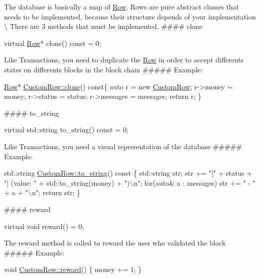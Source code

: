 The database is basically a map of \mbox{\hyperlink{classRow}{Row}}. Rows are pure abstract classes that needs to be implemented, because their structure depends of your implementation \textbackslash{} There are 3 methods that must be implemented. \#\#\#\# clone 
\begin{DoxyCode}
\textcolor{keyword}{virtual} \mbox{\hyperlink{classRow}{Row}}* clone() \textcolor{keyword}{const} = 0;
\end{DoxyCode}
 Like Transactions, you need to duplicate the \mbox{\hyperlink{classRow}{Row}} in order to accept differents states on differents blocks in the block chain \#\#\#\#\# Example\+: 
\begin{DoxyCode}
\mbox{\hyperlink{classRow}{Row}}* \mbox{\hyperlink{classCustomRow_a9d3c1b6bda5e63de382cc4a2aa29210d}{CustomRow::clone}}()\textcolor{keyword}{ const}\{
    \textcolor{keyword}{auto} r = \textcolor{keyword}{new} \mbox{\hyperlink{classCustomRow}{CustomRow}};
    r->money = money;
    r->status = status;
    r->messages = messages;
    \textcolor{keywordflow}{return} r;
\}
\end{DoxyCode}
 \#\#\#\# to\+\_\+string 
\begin{DoxyCode}
\textcolor{keyword}{virtual} std::string to\_string() \textcolor{keyword}{const} = 0;
\end{DoxyCode}
 Like Transactions, you need a visual representation of the database \#\#\#\#\# Example\+: 
\begin{DoxyCode}
std::string \mbox{\hyperlink{classCustomRow_ae1e5a3b861829f8b295d3c743d6b3c7a}{CustomRow::to\_string}}()\textcolor{keyword}{ const }\{
    std::string str;
    str += \textcolor{stringliteral}{"["} + status + \textcolor{stringliteral}{"] (value: "} + std::to\_string(money) + \textcolor{stringliteral}{")\(\backslash\)n"};
    \textcolor{keywordflow}{for}(\textcolor{keyword}{auto}\& a : messages)
        str += \textcolor{stringliteral}{" - "} + a + \textcolor{stringliteral}{"\(\backslash\)n"};
    \textcolor{keywordflow}{return} str;
\}
\end{DoxyCode}
 \#\#\#\# reward 
\begin{DoxyCode}
\textcolor{keyword}{virtual} \textcolor{keywordtype}{void} reward() = 0;
\end{DoxyCode}
 The reward method is called to reward the user who validated the block \#\#\#\#\# Example\+: 
\begin{DoxyCode}
\textcolor{keywordtype}{void} \mbox{\hyperlink{classCustomRow_a007002dc965ca2727ec8db0183404bf1}{CustomRow::reward}}() \{
    money += 1;
\}
\end{DoxyCode}
